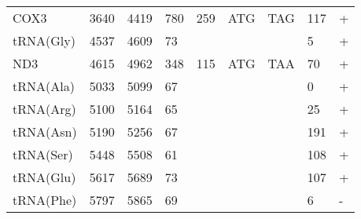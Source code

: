 \documentclass[../DISSERTACAO_MAIN.tex]{subfiles}
\begin{document}
\begin{longtable}{llllllllllllllllllllll}
			COX3         & 3640           & \multicolumn{2}{l}{4419}  & \multicolumn{2}{l}{780}        & \multicolumn{3}{l}{259}                       & \multicolumn{3}{l}{ATG}           & \multicolumn{3}{l}{TAG}   & \multicolumn{3}{l}{117}         & \multicolumn{4}{l}{+}                  \\
			tRNA(Gly)    & 4537           & \multicolumn{2}{l}{4609}  & \multicolumn{2}{l}{73}         & \multicolumn{3}{l}{}                          & \multicolumn{3}{l}{}              & \multicolumn{3}{l}{}      & \multicolumn{3}{l}{5}           & \multicolumn{4}{l}{+}                  \\
			ND3          & 4615           & \multicolumn{2}{l}{4962}  & \multicolumn{2}{l}{348}        & \multicolumn{3}{l}{115}                       & \multicolumn{3}{l}{ATG}           & \multicolumn{3}{l}{TAA}   & \multicolumn{3}{l}{70}          & \multicolumn{4}{l}{+}                  \\
			tRNA(Ala)    & 5033           & \multicolumn{2}{l}{5099}  & \multicolumn{2}{l}{67}         & \multicolumn{3}{l}{}                          & \multicolumn{3}{l}{}              & \multicolumn{3}{l}{}      & \multicolumn{3}{l}{0}           & \multicolumn{4}{l}{+}                  \\
			tRNA(Arg)    & 5100           & \multicolumn{2}{l}{5164}  & \multicolumn{2}{l}{65}         & \multicolumn{3}{l}{}                          & \multicolumn{3}{l}{}              & \multicolumn{3}{l}{}      & \multicolumn{3}{l}{25}          & \multicolumn{4}{l}{+}                  \\
			tRNA(Asn)    & 5190           & \multicolumn{2}{l}{5256}  & \multicolumn{2}{l}{67}         & \multicolumn{3}{l}{}                          & \multicolumn{3}{l}{}              & \multicolumn{3}{l}{}      & \multicolumn{3}{l}{191}         & \multicolumn{4}{l}{+}                  \\
			tRNA(Ser)    & 5448           & \multicolumn{2}{l}{5508}  & \multicolumn{2}{l}{61}         & \multicolumn{3}{l}{}                          & \multicolumn{3}{l}{}              & \multicolumn{3}{l}{}      & \multicolumn{3}{l}{108}         & \multicolumn{4}{l}{+}                  \\
			tRNA(Glu)    & 5617           & \multicolumn{2}{l}{5689}  & \multicolumn{2}{l}{73}         & \multicolumn{3}{l}{}                          & \multicolumn{3}{l}{}              & \multicolumn{3}{l}{}      & \multicolumn{3}{l}{107}         & \multicolumn{4}{l}{+}                  \\
			tRNA(Phe)    & 5797           & \multicolumn{2}{l}{5865}  & \multicolumn{2}{l}{69}         & \multicolumn{3}{l}{}                          & \multicolumn{3}{l}{}              & \multicolumn{3}{l}{}      & \multicolumn{3}{l}{6}           & \multicolumn{4}{l}{-}                  \\

\end{longtable}
\end{document}
